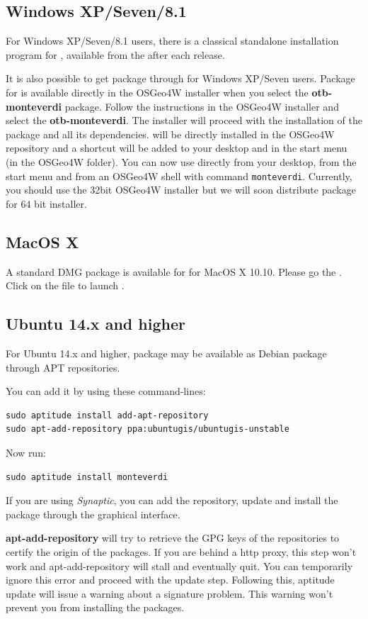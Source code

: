 \subsection{Windows XP/Seven/8.1}
For Windows XP/Seven/8.1 users, there is a classical standalone installation program for \mont, available from the \download after each release. 

It is also possible to get \mont package through \osgeow for Windows XP/Seven users. 
Package for \mont is available directly in the OSGeo4W installer when you select the \textbf{otb-monteverdi} package. 
Follow the instructions in the OSGeo4W installer and select the \textbf{otb-monteverdi}. 
The installer will proceed with the installation of the package and all its dependencies. 
\mont will be directly installed in the OSGeo4W repository and a shortcut will be added to your desktop and in the start menu (in the OSGeo4W folder). 
You can now use directly \mont from your desktop, from the start menu and from an OSGeo4W shell with command \texttt{monteverdi}. 
Currently, you should use the 32bit OSGeo4W installer but we will soon distribute \mont package for 64 bit installer. 

\subsection{MacOS X}
A standard DMG package is available for \mont for MacOS X 10.10. Please go the \download.
Click on the file to launch \mont. 

\subsection{Ubuntu 14.x and higher}
For Ubuntu 14.x and higher, \mont package may be available as Debian package through APT repositories.

You can add it by using these command-lines:
\begin{verbatim}
sudo aptitude install add-apt-repository
sudo apt-add-repository ppa:ubuntugis/ubuntugis-unstable
\end{verbatim}

Now run:
\begin{verbatim}
sudo aptitude install monteverdi
\end{verbatim}

If you are using \emph{Synaptic}, you can add the repository, update and install the package through the
graphical interface.

\textbf{apt-add-repository} will try to retrieve the GPG keys of the
repositories to certify the origin of the packages. If you are behind a http
proxy, this step won't work and apt-add-repository will stall and eventually
quit. You can temporarily ignore this error and proceed with the update
step. Following this, aptitude update will issue a warning about a signature
problem. This warning won't prevent you from installing the packages.


